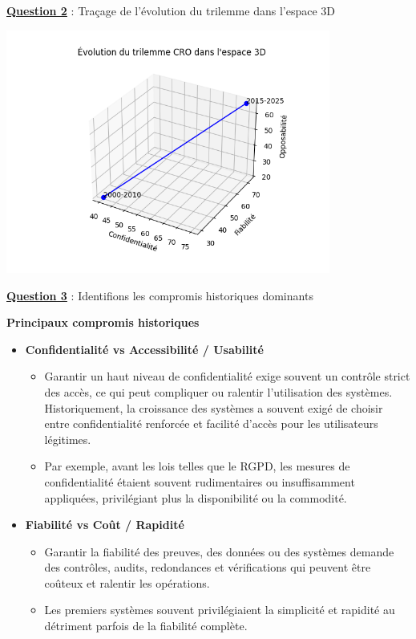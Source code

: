 \documentclass[12pt, a4paper]{article}
\newcommand{\question}[1]{\textbf{\underline{Question #1}}}
\begin{document}
\begin{enumerate}[label=\textbf{\arabic*.}, start=3]
		\question{2} : Traçage de l'évolution du trilemme dans l'espace 3D
		
		\begin{center}
			\includegraphics[width=0.8\textwidth]{image1.png}
		\end{center}
		
		\question{3} : Identifions les compromis historiques dominants
		
		\textbf{Principaux compromis historiques}
		
		\begin{itemize}
			\item \textbf{Confidentialité vs Accessibilité / Usabilité}
			\begin{itemize}
				\item Garantir un haut niveau de confidentialité exige souvent un contrôle strict des accès, ce qui peut compliquer ou ralentir l'utilisation des systèmes. Historiquement, la croissance des systèmes a souvent exigé de choisir entre confidentialité renforcée et facilité d'accès pour les utilisateurs légitimes.
				\item Par exemple, avant les lois telles que le RGPD, les mesures de confidentialité étaient souvent rudimentaires ou insuffisamment appliquées, privilégiant plus la disponibilité ou la commodité.
			\end{itemize}
			
			\item \textbf{Fiabilité vs Coût / Rapidité}
			\begin{itemize}
				\item Garantir la fiabilité des preuves, des données ou des systèmes demande des contrôles, audits, redondances et vérifications qui peuvent être coûteux et ralentir les opérations.
				\item Les premiers systèmes souvent privilégiaient la simplicité et rapidité au détriment parfois de la fiabilité complète.
			\end{itemize}
			

\end{itemize}
\end{enumerate}
\end{document}
